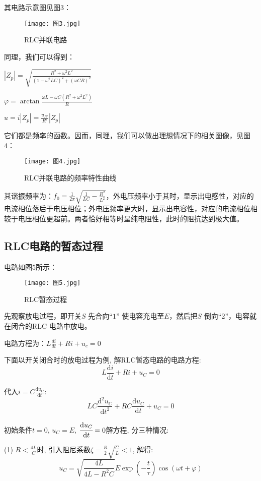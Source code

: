 \documentclass[11pt]{article}
\begin{document}
其电路示意图见图3：

\begin{figure}[H]
    \centering
    \texttt{[image: 图3.jpg]}
    \caption{RLC并联电路}
\end{figure}

同理，我们可以得到：

$\displaystyle |Z_p|=\sqrt{\frac{R^2+\omega^2L^2}{(1-\omega^2LC)^2+(\omega CR)^2}}$

$\varphi=\arctan \frac{\omega L-\omega C(R^2+\omega^2L^2)}{R}$

$u=i|Z_p|=\frac{u_{R'}}{R'}|Z_p|$

它们都是频率的函数。因而，同理，我们可以做出理想情况下的相关图像，见图4：

\begin{figure}[H]
    \centering
    \texttt{[image: 图4.jpg]}
    \caption{RLC并联电路的频率特性曲线}
\end{figure}

其谐振频率为：$\displaystyle f_0=\frac{1}{2\pi}\sqrt{\frac{1}{LC}-\frac{R^2}{L^2}}$，外电压频率小于其时，显示出电感性，对应的电流相位落后于电压相位；外电压频率更大时，显示出电容性，对应的电流相位相较于电压相位更超前。两者恰好相等时呈纯电阻性，此时的阻抗达到极大值。

\subsection{RLC电路的暂态过程}

电路如图5所示：

\begin{figure}[H]
    \centering
    \texttt{[image: 图5.jpg]}
    \caption{RLC暂态过程}
\end{figure}

先观察放电过程，即开关$S$ 先合向$“1”$ 使电容充电至$E$，然后把$S$ 倒向$“2”$，电容就在闭合的RLC 电路中放电。

电路方程为：$\displaystyle L \frac{di}{dt}+Ri+u_c=0$

下面以开关闭合时的放电过程为例, 解RLC暂态电路的电路方程:
\[
    L\frac{\mathrm{d}i}{\mathrm{d}t} + Ri + u_C = 0
\]

代入$\displaystyle i=C\frac{\mathrm{d}u_C}{\mathrm{d}t}$:
\[
    LC\frac{\mathrm{d}^2u_C}{\mathrm{d}t^2} + RC\frac{\mathrm{d}u_C}{\mathrm{d}t} + u_C = 0
\]

初始条件$t = 0$, $u_C = E$, $\cfrac{\mathrm{d}u_C}{\mathrm{d}t} = 0$解方程, 分三种情况:


(1) $\displaystyle R<\frac{4L}{C}$时, 引入阻尼系数$\displaystyle \zeta = \frac{R}{2}\sqrt{\frac{C}{L}} <1$, 解得:
\[
    u_C = \sqrt{\frac{4L}{4L - R^2C}}E \exp\left( -\frac{t}{\tau}\right) \cos(\omega t+\varphi)
\]
\end{document}
